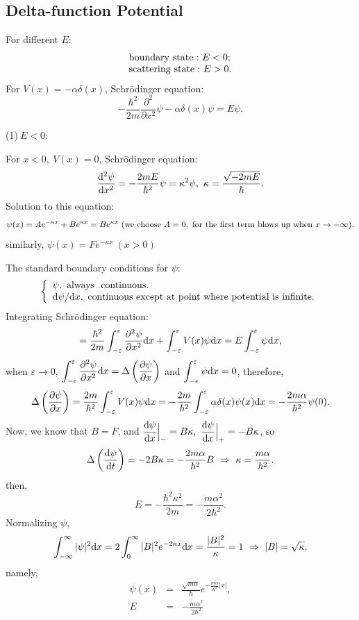 \documentclass[12pt, 
]{article}
\begin{document}
\subsection{Delta-function Potential}
For different $E$:
\[
	\begin{array}{l}
		{\rm boundary~ state:}~E<0;\\
		{\rm scattering~ state:}~E>0.
	\end{array}
\]
For $V(x)=-\alpha \delta(x)$, Schr\"odinger equation:
\[
	-\frac{\hbar^2}{2m}\frac{\partial^2}{\partial x^2}\psi-\alpha\delta(x)\psi=E\psi.
\]

\noindent (1)$~E<0$:

\noindent For $x<0,~V(x)=0$, Schr\"odinger equation:
\[
	\frac{{\rm d}^2 \psi}{{\rm d}x^2}=-\frac{2mE}{\hbar^2}\psi=\kappa^2\psi,~\kappa=\frac{\sqrt{-2mE}}{\hbar}.
\]
Solution to this equation:
\[
	\psi(x)=Ae^{-\kappa x}+Be^{\kappa x}=Be^{\kappa x}~({\rm we~choose} ~A=0,~{\rm for~the~first~term~blows~up~when}~x\rightarrow -\infty),
\]
similarly, $\psi(x)=Fe^{-\kappa x}~(x>0)$

\noindent The standard boundary conditions for $\psi$:
\[
	\left\{
	\begin{array}{l}
		\psi,~{\rm always~~continuous.}\\
		{\rm d}\psi/{\rm d}x,~{\rm continuous~except~at~point~where~potential~is~infinite.}
	\end{array}
	\right.
\]
Integrating Schr\"odinger equation:
\[
	=\frac{\hbar^2}{2m}\int_{-\varepsilon}^{\varepsilon}\frac{\partial^2\psi}{\partial x^2}{\rm d}x+\int_{-\varepsilon}^{\varepsilon}V(x)\psi{\rm d}x=E\int_{-\varepsilon}^{\varepsilon}\psi{\rm d}x,
\]
when $\varepsilon\rightarrow0$, $\displaystyle\int_{-\varepsilon}^\varepsilon\frac{\partial^2\psi}{\partial x^2}{\rm d}x=\Delta\left(\frac{\partial\psi}{\partial x}\right)$ and $\displaystyle\int_{-\varepsilon}^\varepsilon\psi{\rm d}x=0$,
therefore,
\[
	\Delta\left(\frac{\partial\psi}{\partial x}\right)=\frac{2m}{\hbar^2}\int_{-\varepsilon}^\varepsilon V(x)\psi{\rm d}x=-\frac{2m}{\hbar^2}\int_{-\varepsilon}^\varepsilon\alpha\delta(x)\psi(x){\rm d}x=-\frac{2m\alpha}{\hbar^2}\psi(0).
\]
Now, we know that $B=F$, and $\dfrac{{\rm d}\psi}{{\rm d}x}\Big|_{-}=B\kappa,~\dfrac{{\rm d}\psi}{{\rm d}x}\Big|_+=-B\kappa$, so
\[
	\Delta\left(\frac{{\rm d}\psi}{{\rm d}t}\right)=-2B\kappa=-\frac{2m\alpha}{\hbar^2}B~\Rightarrow~\kappa=\frac{m\alpha}{\hbar^2}.
\]
then,
\[
	E=-\frac{\hbar^2\kappa^2}{2m}=-\frac{m\alpha^2}{2\hbar^2}.
\]
Normalizing $\psi$,
\[
	\int_{-\infty}^\infty|\psi|^2{\rm d}x=2\int_0^\infty|B|^2e^{-2\kappa x}{\rm d}x=\frac{{|B|^2}}{\kappa}=1~\Rightarrow~|B|=\sqrt{\kappa},
\]namely,
\begin{eqnarray*}
	\psi(x)&=&\frac{\sqrt{m\alpha}}{\hbar}e^{-\frac{m\alpha}{\hbar^2}|x|},\\
	E&=&-\frac{m\alpha^2}{2\hbar^2}
\end{eqnarray*}
~\\
\end{document}
